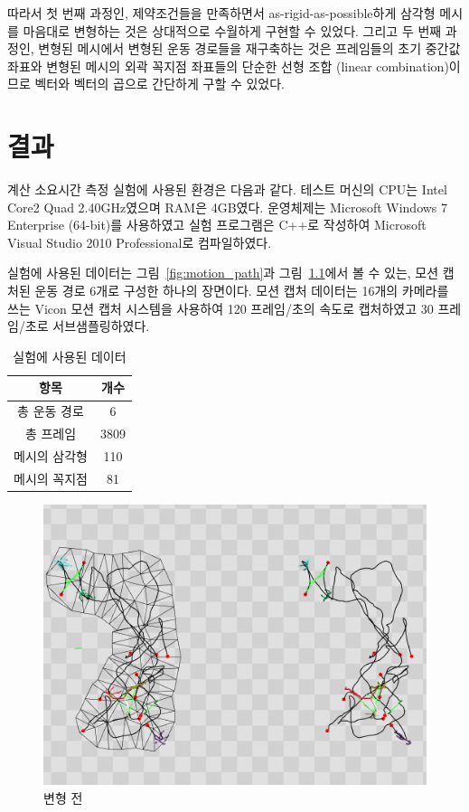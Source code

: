 \documentclass[12pt,a4paper,oneside,final]{report}
\begin{document}
따라서 첫 번째 과정인, 제약조건들을 만족하면서 as-rigid-as-possible하게 삼각형
메시를 마음대로 변형하는 것은 상대적으로 수월하게 구현할 수 있었다. 그리고 두
번째 과정인, 변형된 메시에서 변형된 운동 경로들을 재구축하는 것은 프레임들의
초기 중간값 좌표와 변형된 메시의 외곽 꼭지점 좌표들의 단순한 선형 조합 (linear
combination)이므로 벡터와 벡터의 곱으로 간단하게 구할 수 있었다.

\chapter{결과}
계산 소요시간 측정 실험에 사용된 환경은 다음과 같다. 테스트 머신의 CPU는 Intel
Core2 Quad 2.40GHz였으며 RAM은 4GB였다. 운영체제는 Microsoft Windows 7
Enterprise (64-bit)를 사용하였고 실험 프로그램은 C++로 작성하여 Microsoft
Visual Studio 2010 Professional로 컴파일하였다.

실험에 사용된 데이터는 그림~\ref{fig:motion_path}과
그림~\ref{fig:before_deform}에서 볼 수 있는, 모션 캡처된 운동 경로 6개로 구성한
하나의 장면이다. 모션 캡처 데이터는 16개의 카메라를 쓰는 Vicon 모션 캡처
시스템을 사용하여 120 프레임/초의 속도로 캡처하였고 30 프레임/초로
서브샘플링하였다.

\begin{table}[ht]
\centering
\begin{tabular}{c|c}
\hline
항목 & 개수 \\
\hline
총 운동 경로 & 6 \\
총 프레임 & 3809 \\
메시의 삼각형 & 110 \\
메시의 꼭지점 & 81 \\
\hline
\end{tabular}
\caption{실험에 사용된 데이터}
\label{table:data}
\end{table}

\begin{figure}[p]
\centering
\includegraphics[width=0.9\linewidth]{before_deform_c.png}
\caption{변형 전}
\label{fig:before_deform}
\end{figure}
\end{document}
